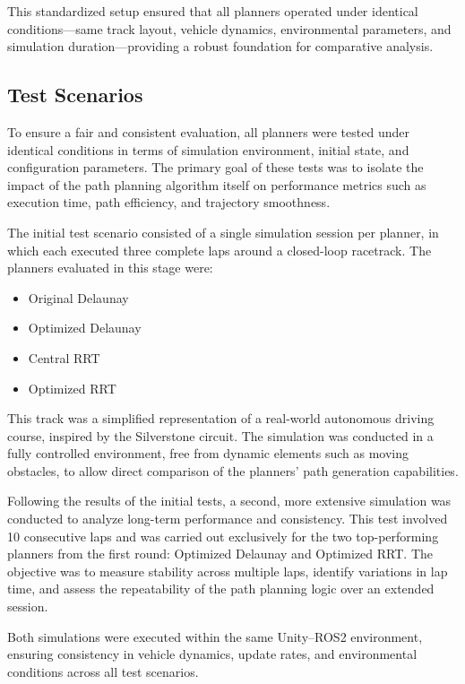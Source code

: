 \documentclass[a4paper,11pt]{report}
\begin{document}
This standardized setup ensured that all planners operated under identical conditions—same track layout, vehicle dynamics, environmental parameters, and simulation duration—providing a robust foundation for comparative analysis.


\subsection{Test Scenarios}

To ensure a fair and consistent evaluation, all planners were tested under identical conditions in terms of simulation environment, initial state, and configuration parameters. The primary goal of these tests was to isolate the impact of the path planning algorithm itself on performance metrics such as execution time, path efficiency, and trajectory smoothness.

The initial test scenario consisted of a single simulation session per planner, in which each executed three complete laps around a closed-loop racetrack. The planners evaluated in this stage were:
\begin{itemize}
  \item Original Delaunay
  \item Optimized Delaunay
  \item Central RRT
  \item Optimized RRT
\end{itemize}

This track was a simplified representation of a real-world autonomous driving course, inspired by the Silverstone circuit. The simulation was conducted in a fully controlled environment, free from dynamic elements such as moving obstacles, to allow direct comparison of the planners' path generation capabilities.

Following the results of the initial tests, a second, more extensive simulation was conducted to analyze long-term performance and consistency. This test involved 10 consecutive laps and was carried out exclusively for the two top-performing planners from the first round: Optimized Delaunay and Optimized RRT. The objective was to measure stability across multiple laps, identify variations in lap time, and assess the repeatability of the path planning logic over an extended session.

Both simulations were executed within the same Unity–ROS2 environment, ensuring consistency in vehicle dynamics, update rates, and environmental conditions across all test scenarios.
\end{document}
